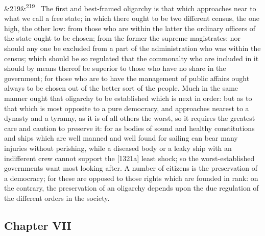 \documentclass[12pt]{article}
\newcommand{\para}[1][]{\par\noindent\ifx&#1&\else\textsuperscript{\footnotesize #1}~\fi}
\begin{document}
\para[219] The first and best-framed oligarchy is that which approaches near to what we call a free state; in which there ought to be two different census, the one high, the other low: from those who are within the latter the ordinary officers of the state ought to be chosen; from the former the supreme magistrates: nor should any one be excluded from a part of the administration who was within the census; which should be so regulated that the commonalty who are included in it should by means thereof be superior to those who have no share in the government; for those who are to have the management of public affairs ought always to be chosen out of the better sort of the people. Much in the same manner ought that oligarchy to be established which is next in order: but as to that which is most opposite to a pure democracy, and approaches nearest to a dynasty and a tyranny, as it is of all others the worst, so it requires the greatest care and caution to preserve it: for as bodies of sound and healthy constitutions and ships which are well manned and well found for sailing can bear many injuries without perishing, while a diseased body or a leaky ship with an indifferent crew cannot support the [1321a] least shock; so the worst-established governments want most looking after. A number of citizens is the preservation of a democracy; for these are opposed to those rights which are founded in rank: on the contrary, the preservation of an oligarchy depends upon the due regulation of the different orders in the society.

\subsection*{Chapter VII}
\end{document}
